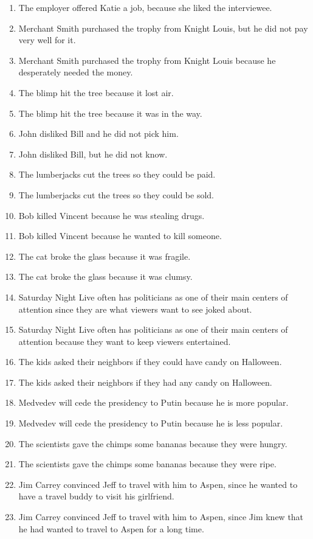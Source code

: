 \documentclass{article}
\begin{document}
\begin{enumerate}
	\item The employer offered Katie a job, because she liked the interviewee.
	\item Merchant Smith purchased the trophy from Knight Louis, but he did not pay very well for it.
	\item Merchant Smith purchased the trophy from Knight Louis because he desperately needed the money.
	\item The blimp hit the tree because it lost air.
	\item The blimp hit the tree because it was in the way.
	\item John disliked Bill and he did not pick him.
	\item John disliked Bill, but he did not know.
	\item The lumberjacks cut the trees so they could be paid.
	\item The lumberjacks cut the trees so they could be sold.
	\item Bob killed Vincent because he was stealing drugs.
	\item Bob killed Vincent because he wanted to kill someone.
	\item The cat broke the glass because it was fragile.
	\item The cat broke the glass because it was clumsy.
	\item Saturday Night Live often has politicians as one of their main centers of attention since they are what viewers want to see joked about.
	\item Saturday Night Live often has politicians as one of their main centers of attention because they want to keep viewers entertained.
	\item The kids asked their neighbors if they could have candy on Halloween.
	\item The kids asked their neighbors if they had any candy on Halloween.
	\item Medvedev will cede the presidency to Putin because he is more popular.
	\item Medvedev will cede the presidency to Putin because he is less popular.
	\item The scientists gave the chimps some bananas because they were hungry.
	\item The scientists gave the chimps some bananas because they were ripe.
	\item Jim Carrey convinced Jeff to travel with him to Aspen, since he wanted to have a travel buddy to visit his girlfriend.
	\item Jim Carrey convinced Jeff to travel with him to Aspen, since Jim knew that he had wanted to travel to Aspen for a long time.

\end{enumerate}
\end{document}
